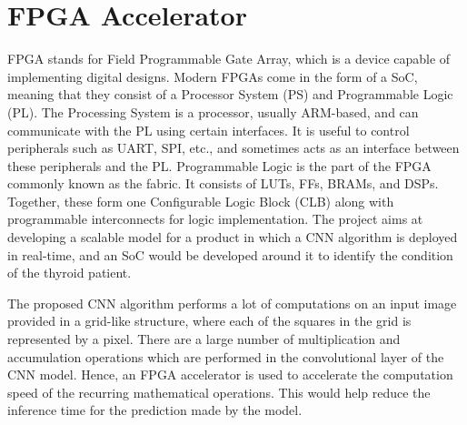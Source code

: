 \section{FPGA Accelerator}
\justifying 
    \noindent
FPGA stands for Field Programmable Gate Array, which is a device capable of implementing digital designs.
Modern FPGAs come in the form of a SoC, meaning that they consist of a Processor System (PS) and Programmable Logic (PL).
The Processing System is a processor, usually ARM-based, and can communicate with the PL using certain interfaces. It is useful to control peripherals such as UART, SPI, etc., and sometimes acts as an interface between these peripherals and the PL.
Programmable Logic is the part of the FPGA commonly known as the fabric. It consists of LUTs, FFs, BRAMs, and DSPs. Together, these form one Configurable Logic Block (CLB) along with programmable interconnects for logic implementation.
The project aims at developing a scalable model for a product in which a CNN algorithm is deployed in real-time, and an SoC would be developed around it to identify the condition of the thyroid patient.\par  \noindent
    The proposed CNN algorithm performs a lot of computations on an input image provided in a grid-like structure, where each of the squares in the grid is represented by a pixel. There are a large number of multiplication and accumulation operations which are performed in the convolutional layer of the CNN model. Hence, an FPGA accelerator is used to accelerate the computation speed of the recurring mathematical operations. This would help reduce the inference time for the prediction made by the model. 
\newpage








